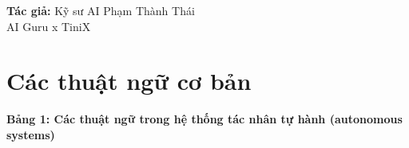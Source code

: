 \documentclass[]{article}
\begin{document}
\vspace*{\fill}
\begin{center}
\textbf{Tác giả:} Kỹ sư AI Phạm Thành Thái\\
AI Guru x TiniX
\end{center}
\vspace{1cm}
\newpage

\renewcommand{\contentsname}{\begin{center}\color{primary}\textbf{\MakeUppercase{Mục Lục}}\end{center}}
\tableofcontents
\newpage

\hypertarget{cac-thuat-ngu-co-ban}{%
\section*{Các thuật ngữ cơ bản}\label{cac-thuat-ngu-co-ban}}

\vspace{2.5mm}
\noindent\textbf{Bảng 1: Các thuật ngữ trong hệ thống tác nhân tự hành (autonomous systems)}\label{tab:thuat-ngu}
\end{document}
